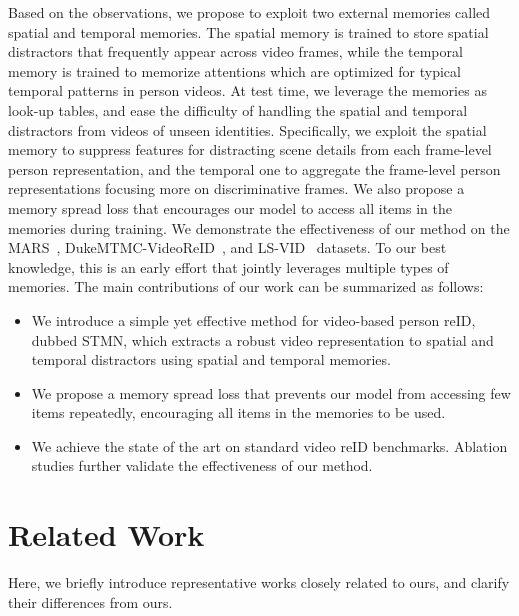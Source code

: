 \documentclass[10pt,twocolumn,letterpaper]{article}
\begin{document}
Based on the observations, we propose to exploit two external memories called spatial and temporal memories. The spatial memory is trained to store spatial distractors that frequently appear across video frames, while the temporal memory is trained to memorize attentions which are optimized for typical temporal patterns in person videos. At test time, we leverage the memories as look-up tables, and ease the difficulty of handling the spatial and temporal distractors from videos of unseen identities. Specifically, we exploit the spatial memory to suppress features for distracting scene details from each frame-level person representation, and the temporal one to aggregate the frame-level person representations focusing more on discriminative frames. We also propose a memory spread loss that encourages our model to access all items in the memories during training. We demonstrate the effectiveness of our method on the MARS~\cite{zheng2016mars}, DukeMTMC-VideoReID~\cite{wu2018exploit}, and LS-VID~\cite{li2019global} datasets. To our best knowledge, this is an early effort that jointly leverages multiple types of memories. The main contributions of our work can be summarized as follows:

	\vspace{-0.1cm}	
	\begin{itemize}[leftmargin=*]
		\item[] We introduce a simple yet effective method for video-based person reID, dubbed STMN, which extracts a robust video representation to spatial and temporal distractors using spatial and temporal memories.
		\vspace{-0.1cm}
		\item[] We propose a memory spread loss that prevents our model from accessing few items repeatedly, encouraging all items in the memories to be used.
		\vspace{-0.1cm}
		\item[] We achieve the state of the art on standard video reID benchmarks.  Ablation studies further validate the effectiveness of our method.
	\end{itemize}
	


\section{Related Work}
\vspace{-0.2cm}
	
	Here, we briefly introduce representative works closely related to ours, and clarify their differences from ours.
	
\end{document}
